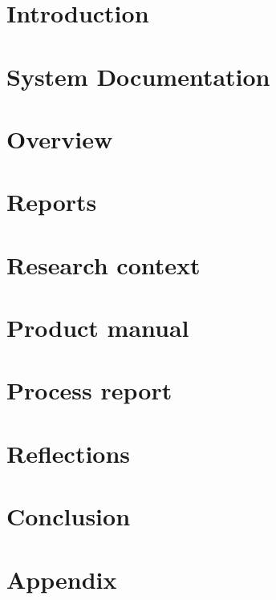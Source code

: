 \documentclass[a4paper,11pt]{report}
\begin{document}
\newpage
\listoftodos   %

\newpage
\tableofcontents
\newpage

\chapter*{Introduction}

\chapter{System Documentation}


\chapter{Overview}


\chapter{Reports}


\chapter{Research context}


\chapter{Product manual}


\chapter{Process report}


\chapter{Reflections}



\chapter*{Conclusion}


\appendix
\chapter{Appendix}

\end{document}
